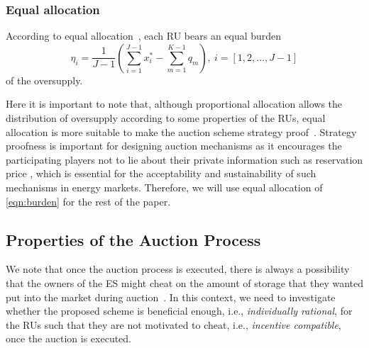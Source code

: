 \documentclass[journal,10pt]{IEEEtran}
\begin{document}
\subsubsection{Equal allocation}\label{sec:equal-allocation}
According to equal allocation~\cite{Huang-doubleauction:2002}, each RU bears an equal burden
\begin{equation}
\eta_i = \frac{1}{J-1}\left(\sum_{i=1}^{J-1}x_i^* - \sum_{m=1}^{K-1}q_m\right), ~i = [1, 2, \hdots, J-1]
\label{eqn:burden}
\end{equation}
of the oversupply. 

Here it is important to note that, although proportional allocation allows the distribution of oversupply according to some properties of the RUs, equal allocation is more suitable to make the auction scheme strategy proof~\cite{Huang-doubleauction:2002}. Strategy proofness  is important for designing auction mechanisms as it encourages the participating players not to lie about their private information such as reservation price \cite{Saad-CSmartgridComm:2011}, which is essential for the acceptability and sustainability of such mechanisms in energy markets. Therefore, we will use equal allocation of \eqref{eqn:burden} for the rest of the paper.

\subsection{Properties of the Auction Process}We note that once the auction process is executed, there is always a possibility that the owners of the ES might cheat on the amount of storage that they wanted put into the market during auction~\cite{Ma-JTSG:2014}. In this context, we need to investigate whether the proposed scheme is beneficial enough, i.e., \emph{individually rational}, for the RUs such that they are not motivated to cheat, i.e., \emph{incentive compatible}, once the auction is executed.
\end{document}
